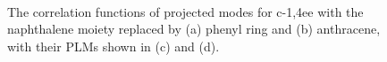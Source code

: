 \begin{figure}[t]
\\
\caption{The correlation functions of projected modes for c-1,4ee with the naphthalene moiety
replaced by (a) phenyl ring and (b) anthracene, with their PLMs shown in (c) and (d). \label{benz}}
\end{figure}

